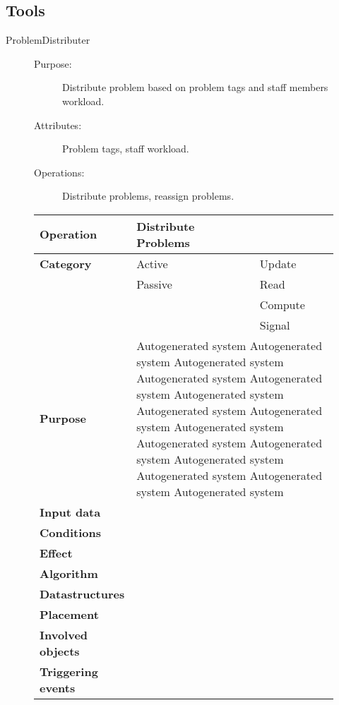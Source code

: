 \subsection{Tools}

\begin{description}
\item[ProblemDistributer]\hfill
\begin{description}
\item[Purpose:]Distribute problem based on problem tags and staff members workload.
\item[Attributes:]Problem tags, staff workload.
\item[Operations:]Distribute problems, reassign problems.
\end{description}
\end{description}

\begin{figure}
\begin{tabular}{p{3.5cm} p{4cm} p{4cm}}
\hline
\textbf{Operation}&Distribute Problems\\
\hline
\textbf{Category}&\underline{ }Active&\underline{ }Update\\
&\underline{ }Passive&\underline{ }Read\\
&&\underline{ }Compute\\
&&\underline{ }Signal\\
\textbf{Purpose}&\multicolumn{2}{p{8cm}}{Autogenerated system Autogenerated system Autogenerated system Autogenerated system Autogenerated system Autogenerated system
Autogenerated system Autogenerated system Autogenerated system Autogenerated system Autogenerated system Autogenerated system 
Autogenerated system Autogenerated system Autogenerated system}\\
\textbf{Input data}&\multicolumn{2}{p{8cm}}{}\\
\textbf{Conditions}&\multicolumn{2}{p{8cm}}{}\\
\textbf{Effect}&\multicolumn{2}{p{8cm}}{}\\
\textbf{Algorithm}&\multicolumn{2}{p{8cm}}{}\\
\textbf{Datastructures}&\multicolumn{2}{p{8cm}}{}\\
\textbf{Placement}&\multicolumn{2}{p{8cm}}{}\\
\textbf{Involved objects}&\multicolumn{2}{p{8cm}}{}\\
\textbf{Triggering events}&\multicolumn{2}{p{8cm}}{}\\
\hline
\end{tabular}
\end{figure}


